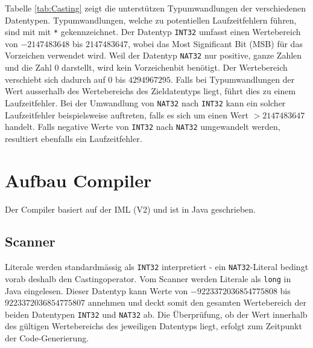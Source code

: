 \documentclass[10pt, a4paper, twocolumn]{article} %
\begin{document}
Tabelle \ref{tab:Casting} zeigt die unterstützen Typumwandlungen der verschiedenen Datentypen.
Typumwandlungen, welche zu potentiellen Laufzeitfehlern führen, sind mit mit \texttt{*} gekennzeichnet.
Der Datentyp \texttt{INT32} umfasst einen Wertebereich von $-2147483648$ bis $2147483647$, wobei das Most Significant Bit (MSB) für das Vorzeichen verwendet wird.
Weil der Datentyp \texttt{NAT32} nur positive, ganze Zahlen und die Zahl 0 darstellt, wird kein Vorzeichenbit benötigt.
Der Wertebereich verschiebt sich dadurch auf $0$ bis $4294967295$.
Falls bei Typumwandlungen der Wert ausserhalb des Wertebereichs des Zieldatentyps liegt, führt dies zu einem Laufzeitfehler.
Bei der Umwandlung von \texttt{NAT32} nach \texttt{INT32} kann ein solcher Laufzeitfehler beispielsweise auftreten, falls es sich um einen Wert $> 2147483647$ handelt.
Falls negative Werte von \texttt{INT32} nach \texttt{NAT32} umgewandelt werden, resultiert ebenfalls ein Laufzeitfehler.
\begin{table}[h]
    \tiny
    \centering
    \caption{Casting zwischen Datentypen}
    \label{tab:Casting}
\end{table}

\section{Aufbau Compiler}
Der Compiler basiert auf der IML (V2) und ist in Java geschrieben.

\subsection{Scanner}
\label{scanner}
Literale werden standardmässig als \texttt{INT32} interpretiert - ein \texttt{NAT32}-Literal bedingt vorab deshalb den Castingoperator.
Vom Scanner werden Literale als \texttt{long} in Java eingelesen.
Dieser Datentyp kann Werte von $-9223372036854775808$ bis $9223372036854775807$ annehmen und deckt somit den gesamten Wertebereich der beiden Datentypen \texttt{INT32} und \texttt{NAT32} ab.
Die Überprüfung, ob der Wert innerhalb des gültigen Wertebereichs des jeweiligen Datentyps liegt, erfolgt zum Zeitpunkt der Code-Generierung.
\end{document}
